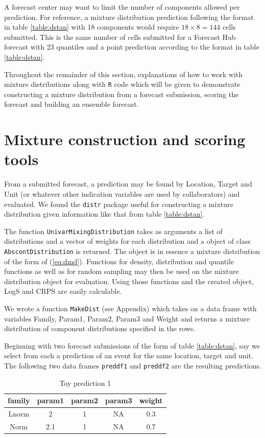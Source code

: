 \documentclass[11pt,notitlepage]{isuthesis}
\begin{document}
A forecast center may want to limit the number of components allowed per 
prediction. For reference, a mixture distribution prediction following the 
format in table \ref{table:dstan} with 18 
components would require $18 \times 8 = 144$ cells submitted. This is the same 
number of cells
submitted for a Forecast Hub forecast with 23 quantiles and a point prediction 
according to the format in table \ref{table:dstan}.

Throughout the remainder of this section, explanations of how to work with 
mixture distributions along with \texttt{R} code which will be given to 
demonstrate constructing a mixture distribution from a forecast submission, 
scoring the forecast and building an ensemble forecast.

\section{Mixture construction and scoring tools}
\label{section:tools}

From a submitted forecast, a prediction may be found by Location, Target and 
Unit (or whatever other indication variables are used by collaborators) and 
evaluated. We found
the \texttt{distr} package \cite{camphausen2007distr}
useful for constructing a mixture distribution given
information like that from table \ref{table:dstan}. 

The function 
\texttt{UnivarMixingDistribution} takes as arguments a list of distributions
and a vector of weights for each distribution and a object of class 
\texttt{AbscontDistribution} is returned. The object is in essence a mixture
distribution of the form of (\ref{eq:dmd}). Functions for density, 
distribution
and quantile functions as well as for random sampling may then be used on the
mixture distribution object for evaluation. Using those functions and the 
created object, LogS and CRPS are easily calculable. 

We wrote a function \texttt{MakeDist} (see Appendix)
which takes on a data frame with variables
Family, Param1, Param2, Param3 and Weight and returns a mixture distribution 
of component distributions specified in the rows.

Beginning with two forecast submissions of the form of table \ref{table:dstan}, 
say we select from each a prediction of an event for the same location, target
and unit. The following two data frames \texttt{preddf1} and \texttt{preddf2}
are the resulting predictions.

\begin{table}[h!]
\centering
 \begin{tabular}{|c|c|c|c|c|}
 \hline
    family & param1 & param2 & param3 & weight
    \\ \hline
    Lnorm & 2 & 1 & NA & 0.3  \\
    Norm & 2.1 & 1 & NA & 0.7 \\
 \hline
 \end{tabular}
 \caption[Toy prediction 1]{Toy prediction 1}
 \label{tab:preddf1}
\end{table}
\end{document}
